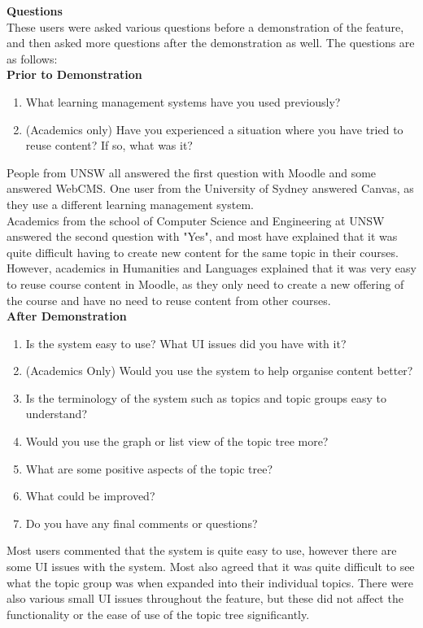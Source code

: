 \textbf{Questions} \\
These users were asked various questions before a demonstration of the feature, and then asked more questions after the demonstration as well. The questions are as follows:\\
\textbf{Prior to Demonstration}
\begin{enumerate}
    \item What learning management systems have you used previously?
    \item (Academics only) Have you experienced a situation where you have tried to reuse content? If so, what was it?
\end{enumerate}

People from UNSW all answered the first question with Moodle and some answered WebCMS. One user from the University of Sydney answered Canvas, as they use a different learning management system.\\
Academics from the school of Computer Science and Engineering at UNSW answered the second question with "Yes", and most have explained that it was quite difficult having to create new content for the same topic in their courses. However, academics in Humanities and Languages explained that it was very easy to reuse course content in Moodle, as they only need to create a new offering of the course and have no need to reuse content from other courses.\\

\textbf{After Demonstration}
\begin{enumerate}
    \item Is the system easy to use? What UI issues did you have with it?
    \item (Academics Only) Would you use the system to help organise content better?
    \item Is the terminology of the system such as topics and topic groups easy to understand?
    \item Would you use the graph or list view of the topic tree more?
    \item What are some positive aspects of the topic tree?
    \item What could be improved?
    \item Do you have any final comments or questions?
\end{enumerate}

Most users commented that the system is quite easy to use, however there are some UI issues with the system. Most also agreed that it was quite difficult to see what the topic group was when expanded into their individual topics. There were also various small UI issues throughout the feature, but these did not affect the functionality or the ease of use of the topic tree significantly. \\

